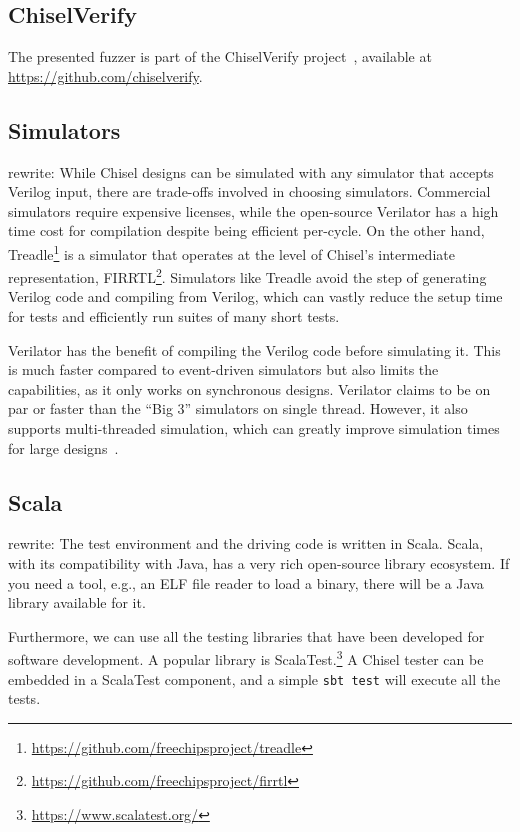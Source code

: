 \documentclass[conference]{IEEEtran}
\newcommand{\code}[1]{{\small{\texttt{#1}}}}
\newcommand{\rewrite}[1]{{\color{red} rewrite: #1}}
\begin{document}
\subsection{ChiselVerify}

The presented fuzzer is part of the ChiselVerify project~\cite{verify:chisel:2020, dobis2021opensource}, available
at \url{https://github.com/chiselverify}.

\subsection{Simulators}

\rewrite{While Chisel designs can be simulated with any simulator that accepts Verilog input, there are trade-offs involved in choosing simulators.
Commercial simulators require expensive licenses, while the open-source Verilator has a high time cost for compilation despite being efficient per-cycle.
On the other hand, Treadle\footnote{\url{https://github.com/freechipsproject/treadle}} is a simulator that operates at the level of Chisel's intermediate representation, FIRRTL\footnote{\url{https://github.com/freechipsproject/firrtl}}.
Simulators like Treadle avoid the step of generating Verilog code and compiling from Verilog, which can vastly reduce the setup time for tests and efficiently run suites of many short tests.

Verilator has the benefit of compiling the Verilog code before simulating it. This is much faster compared to event-driven simulators but also limits the capabilities, as it only works on synchronous designs. Verilator claims to be on par or faster than the ``Big 3'' simulators on single thread. However, it also supports multi-threaded simulation, which can greatly improve simulation times for large designs~\cite{verilator}.}


\subsection{Scala}

\rewrite{The test environment and the driving code is written in Scala. Scala, with its
compatibility with Java, has a very rich open-source library ecosystem.
If you need a tool, e.g., an ELF file reader to load a binary, there will be a Java
library available for it.

Furthermore, we can use all the testing libraries that have been developed for
software development. A popular library is ScalaTest.\footnote{\url{https://www.scalatest.org/}}
A Chisel tester can be embedded
in a ScalaTest component, and a simple \code{sbt test} will execute all the tests.}
\end{document}
